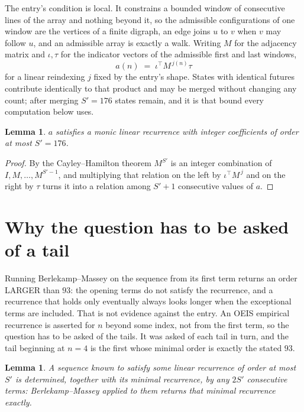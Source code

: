 \documentclass[11pt,a4paper]{article}
\theoremstyle{plain}
\newtheorem{lemma}[theorem]{Lemma}
\theoremstyle{definition}
\begin{document}
The entry's condition is local. It constrains a bounded window of consecutive lines of the
array and nothing beyond it, so the admissible configurations of one window are the vertices of
a finite digraph, an edge joins $u$ to $v$ when $v$ may follow $u$, and an admissible array is
exactly a walk. Writing $M$ for the adjacency matrix and $\iota,\tau$ for the indicator vectors
of the admissible first and last windows,
\[
a(n)\;=\;\iota^{\!\top}M^{\,j(n)}\tau
\]
for a linear reindexing $j$ fixed by the entry's shape. States with identical futures
contribute identically to that product and may be merged without changing any count; after
merging $S'=176$ states remain, and it is that bound every computation below uses.

\begin{lemma}\label{lem:cf}
$a$ satisfies a monic linear recurrence with integer coefficients of order at most $S'=176$.
\end{lemma}

\begin{proof}
By the Cayley--Hamilton theorem $M^{S'}$ is an integer combination of $I,M,\dots,M^{S'-1}$,
and multiplying that relation on the left by $\iota^{\!\top}M^{\,j}$ and on the right by
$\tau$ turns it into a relation among $S'+1$ consecutive values of $a$.
\end{proof}

\section{Why the question has to be asked of a tail}

Running Berlekamp--Massey on the sequence from its first term returns an order LARGER than $93$: the opening terms do not satisfy the recurrence, and a recurrence that holds only eventually always looks longer when the exceptional terms are included. That is not evidence against the entry. An OEIS empirical recurrence is asserted for $n$ beyond some index, not from the first term, so the question has to be asked of the tails. It was asked of each tail in turn, and the tail beginning at $n=4$ is the first whose minimal order is exactly the stated $93$.

\begin{lemma}\label{lem:bm}
A sequence known to satisfy some linear recurrence of order at most $S'$ is determined,
together with its minimal recurrence, by any $2S'$ consecutive terms: Berlekamp--Massey applied
to them returns that minimal recurrence exactly.
\end{lemma}
\end{document}
